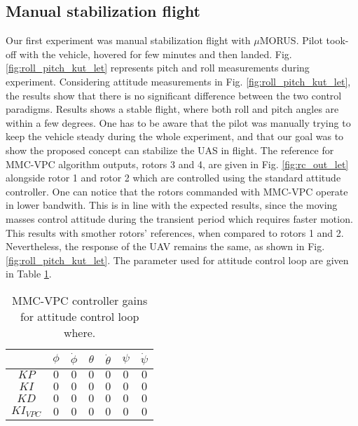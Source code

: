 
\subsection{Manual stabilization flight}

Our first experiment was manual stabilization flight with $\mu$MORUS. Pilot took-off with the vehicle, hovered for few minutes and then landed. Fig. \ref{fig:roll_pitch_kut_let} represents pitch and roll measurements during experiment. Considering attitude measurements in Fig. \ref{fig:roll_pitch_kut_let}, the results show that there is no significant difference between the two control paradigms. Results shows a stable flight, where both roll and pitch angles are within a few degrees. One has to be aware that the pilot was manually trying to keep the vehicle steady during the whole experiment, and that our goal was to show the proposed concept can stabilize the UAS in flight. The reference for MMC-VPC algorithm outputs, rotors 3 and 4, are given in Fig. \ref{fig:rc_out_let} alongside rotor 1 and rotor 2 which are controlled using the standard attitude controller. One can notice that the rotors commanded with MMC-VPC operate in lower bandwith. This is in line with the expected results, since the moving masses control attitude during the transient period which requires faster motion. This results with smother rotors' references, when compared to rotors 1 and 2. Nevertheless, the response of the UAV remains the same, as shown in Fig. \ref{fig:roll_pitch_kut_let}. The parameter used for attitude control loop are given in Table \ref{table:attitude_control_params}.

\begin{table}[h!]
\centering
\caption{MMC-VPC controller gains for attitude control loop where.}
\label{table:attitude_control_params}
\begin{tabular}{|c|c|c|c|c|c|c|}
\hline
 & $\phi$ & $\dot{\phi}$ & $\theta$ & $\dot{\theta}$ & $\psi$ & $\dot{\psi}$\\
\hline
$KP$ & $0$ & $0$ & $0$ & $0$ & $0$ & $0$\\
\hline
$KI$ & $0$ & $0$ & $0$ & $0$ & $0$ & $0$\\
\hline
$KD$ & $0$ & $0$ & $0$ & $0$ & $0$ & $0$\\
\hline
$KI_{VPC}$ & $0$ & $0$ & $0$ & $0$ & $0$ & $0$\\
\hline
\end{tabular}
\end{table}

